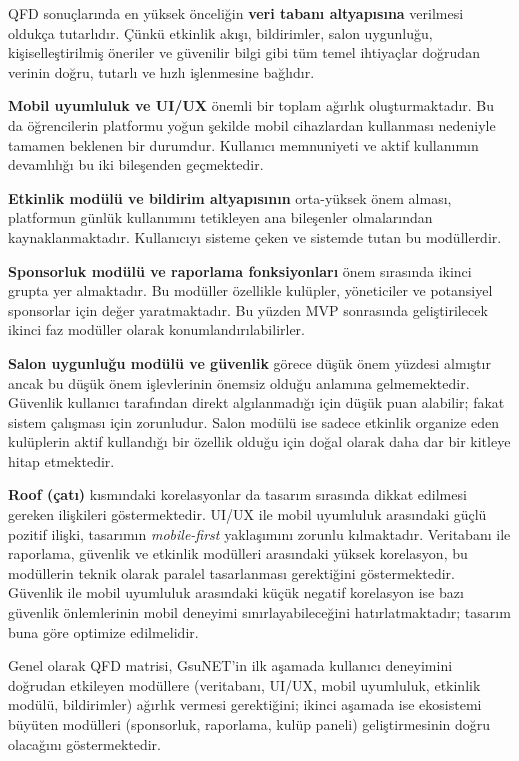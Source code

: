 \documentclass[a4paper,12pt]{report}
\begin{document}
QFD sonuçlarında en yüksek önceliğin \textbf{veri tabanı altyapısına} verilmesi oldukça tutarlıdır. Çünkü etkinlik akışı, bildirimler, salon uygunluğu, kişiselleştirilmiş öneriler ve güvenilir bilgi gibi tüm temel ihtiyaçlar doğrudan verinin doğru, tutarlı ve hızlı işlenmesine bağlıdır.

\textbf{Mobil uyumluluk ve UI/UX} önemli bir toplam ağırlık oluşturmaktadır. Bu da öğrencilerin platformu yoğun şekilde mobil cihazlardan kullanması nedeniyle tamamen beklenen bir durumdur. Kullanıcı memnuniyeti ve aktif kullanımın devamlılığı bu iki bileşenden geçmektedir.

\textbf{Etkinlik modülü ve bildirim altyapısının} orta-yüksek önem alması, platformun günlük kullanımını tetikleyen ana bileşenler olmalarından kaynaklanmaktadır. Kullanıcıyı sisteme çeken ve sistemde tutan bu modüllerdir.

\textbf{Sponsorluk modülü ve raporlama fonksiyonları} önem sırasında ikinci grupta yer almaktadır. Bu modüller özellikle kulüpler, yöneticiler ve potansiyel sponsorlar için değer yaratmaktadır. Bu yüzden MVP sonrasında geliştirilecek ikinci faz modüller olarak konumlandırılabilirler.

\textbf{Salon uygunluğu modülü ve güvenlik} görece düşük önem yüzdesi almıştır ancak bu düşük önem işlevlerinin önemsiz olduğu anlamına gelmemektedir. Güvenlik kullanıcı tarafından direkt algılanmadığı için düşük puan alabilir; fakat sistem çalışması için zorunludur. Salon modülü ise sadece etkinlik organize eden kulüplerin aktif kullandığı bir özellik olduğu için doğal olarak daha dar bir kitleye hitap etmektedir.

\textbf{Roof (çatı)} kısmındaki korelasyonlar da tasarım sırasında dikkat edilmesi gereken ilişkileri göstermektedir. UI/UX ile mobil uyumluluk arasındaki güçlü pozitif ilişki, tasarımın \textit{mobile-first} yaklaşımını zorunlu kılmaktadır. Veritabanı ile raporlama, güvenlik ve etkinlik modülleri arasındaki yüksek korelasyon, bu modüllerin teknik olarak paralel tasarlanması gerektiğini göstermektedir. Güvenlik ile mobil uyumluluk arasındaki küçük negatif korelasyon ise bazı güvenlik önlemlerinin mobil deneyimi sınırlayabileceğini hatırlatmaktadır; tasarım buna göre optimize edilmelidir.

Genel olarak QFD matrisi, GsuNET'in ilk aşamada kullanıcı deneyimini doğrudan etkileyen modüllere (veritabanı, UI/UX, mobil uyumluluk, etkinlik modülü, bildirimler) ağırlık vermesi gerektiğini; ikinci aşamada ise ekosistemi büyüten modülleri (sponsorluk, raporlama, kulüp paneli) geliştirmesinin doğru olacağını göstermektedir.
\end{document}
